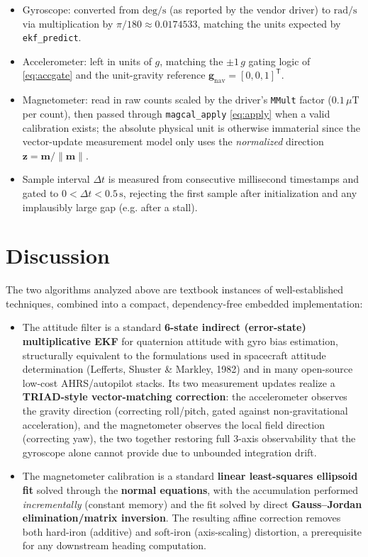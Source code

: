 \documentclass[11pt]{article}
\newcommand{\vect}[1]{\bm{#1}}
\newcommand{\transpose}{^{\mathsf{T}}}
\begin{document}
\begin{itemize}
    \item Gyroscope: converted from $\mathrm{deg/s}$ (as reported by the vendor driver) to $\mathrm{rad/s}$ via multiplication by $\pi/180 \approx 0.0174533$, matching the units expected by \texttt{ekf\_predict}.
    \item Accelerometer: left in units of $g$, matching the $\pm1\,g$ gating logic of \eqref{eq:accgate} and the unit-gravity reference $\vect g_{\text{nav}}=[0,0,1]\transpose$.
    \item Magnetometer: read in raw counts scaled by the driver's \texttt{MMult} factor ($0.1\,\mu\mathrm{T}$ per count), then passed through \texttt{magcal\_apply} \eqref{eq:apply} when a valid calibration exists; the absolute physical unit is otherwise immaterial since the vector-update measurement model only uses the \emph{normalized} direction $\vect z = \vect m/\lVert \vect m\rVert$.
    \item Sample interval $\Delta t$ is measured from consecutive millisecond timestamps and gated to $0 < \Delta t < 0.5\,\mathrm{s}$, rejecting the first sample after initialization and any implausibly large gap (e.g. after a stall).
\end{itemize}

\section{Discussion}

The two algorithms analyzed above are textbook instances of well-established techniques, combined into a compact, dependency-free embedded implementation:

\begin{itemize}
    \item The attitude filter is a standard \textbf{6-state indirect (error-state) multiplicative EKF} for quaternion attitude with gyro bias estimation, structurally equivalent to the formulations used in spacecraft attitude determination (Lefferts, Shuster \& Markley, 1982) and in many open-source low-cost AHRS/autopilot stacks. Its two measurement updates realize a \textbf{TRIAD-style vector-matching correction}: the accelerometer observes the gravity direction (correcting roll/pitch, gated against non-gravitational acceleration), and the magnetometer observes the local field direction (correcting yaw), the two together restoring full 3-axis observability that the gyroscope alone cannot provide due to unbounded integration drift.
    \item The magnetometer calibration is a standard \textbf{linear least-squares ellipsoid fit} solved through the \textbf{normal equations}, with the accumulation performed \emph{incrementally} (constant memory) and the fit solved by direct \textbf{Gauss--Jordan elimination/matrix inversion}. The resulting affine correction removes both hard-iron (additive) and soft-iron (axis-scaling) distortion, a prerequisite for any downstream heading computation.
\end{itemize}
\end{document}
